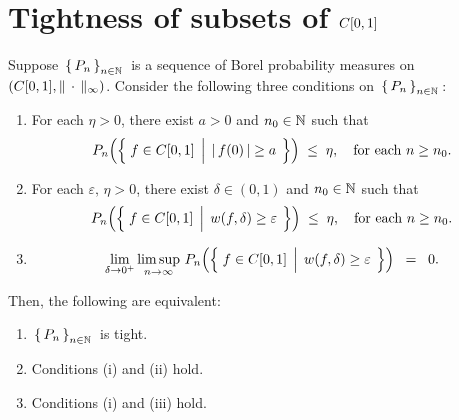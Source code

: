 

\section{Tightness of subsets of $C[0,1]$}
\setcounter{theorem}{0}
\setcounter{equation}{0}

\renewcommand{\theenumi}{\roman{enumi}}
\renewcommand{\labelenumi}{\textnormal{(\theenumi)}$\;\;$}

\begin{theorem}
\label{NecessarySufficientTightnessCzo}
\mbox{}\vskip 0.1cm
\noindent
Suppose \,$\left\{\,P_{n}\,\right\}_{n\in\mathbb{N}}$\, is a sequence of Borel probability measures on
$\left(C[0,1],\Vert\,\cdot\,\Vert_{\infty}\right)$.
\vskip0.1cm
\noindent
Consider the following three conditions on \,$\left\{\,P_{n}\,\right\}_{n\in\mathbb{N}}$\,:
\renewcommand{\theenumi}{\alph{enumi}}
\renewcommand{\labelenumi}{\textnormal{(\theenumi)}$\;\;$}
\begin{enumerate}
\item	For each $\eta > 0$, there exist $a > 0$ and $n_{0} \in \mathbb{N}$ such that
		\begin{equation*}
		P_{n}\!\left(\left\{\;
			f \in \Czo
			\;\left\vert\;\,
			\vert\,f(0)\,\vert \overset{{\color{white}.}}{\geq} a
			\right.
		\;\right\}\right)
		\;\leq\; \eta,
		\quad
		\textnormal{for each $n \geq n_{0}$}.
		\end{equation*}
\item	For each $\varepsilon,\,\eta > 0$, there exist $\delta \in (0,1)$ and $n_{0} \in \mathbb{N}$ such that
		\begin{equation*}
		P_{n}\!\left(\left\{\;
			f \in \Czo
			\;\left\vert\;\,
			w(f,\delta) \overset{{\color{white}.}}{\geq} \varepsilon
			\right.
		\;\right\}\right)
		\;\leq\; \eta,
		\quad
		\textnormal{for each $n \geq n_{0}$}.
		\end{equation*}
\item
	\begin{equation*}
	\lim_{\delta\rightarrow 0^{+}}
	\limsup_{n\rightarrow\infty}\,
	P_{n}\!\left(\left\{\;
		f \in \Czo
		\;\left\vert\;\,
		w(f,\delta) \overset{{\color{white}.}}{\geq} \varepsilon
		\right.
	\;\right\}\right)
	\;\; = \;\; 0.
	\end{equation*}
\end{enumerate}
\renewcommand{\theenumi}{\roman{enumi}}
\renewcommand{\labelenumi}{\textnormal{(\theenumi)}$\;\;$}
Then, the following are equivalent:
\begin{enumerate}
\item	\,$\left\{\,P_{n}\,\right\}_{n\in\mathbb{N}}$\, is tight.
\item	Conditions (i) and (ii) hold.
\item	Conditions (i) and (iii) hold.
\end{enumerate}
\end{theorem}

